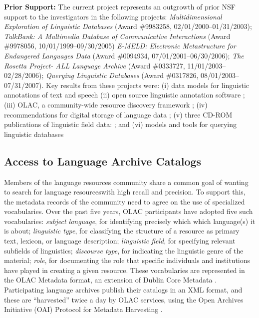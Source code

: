 \textbf{Prior Support:} The current project represents an outgrowth of
prior NSF support to the investigators in the following projects:
\textit{Multidimensional Exploration of Linguistic Databases}
  (Award \#9983258, 02/01/2000--01/31/2003);
\textit{TalkBank: A Multimedia Database of Communicative Interactions}
  (Award \#9978056, 10/01/1999--09/30/2005)
\textit{E-MELD: Electronic Metastructure for Endangered Languages Data}
  (Award \#0094934, 07/01/2001--06/30/2006);
\textit{The Rosetta Project- ALL Language Archive}
  (Award \#0333727, 11/01/2003--02/28/2006);
\textit{Querying Linguistic Databases}
  (Award \#0317826, 08/01/2003--07/31/2007).
Key results from these projects were:
(i) data models for linguistic annotations of text and speech
\citep{BirdLiberman01,MaedaBird00,GraffBird00,CottonBird02,CieriBird01,ATLAS00,BirdHarrington01}
(ii) open source linguistic annotation software
\citep{Bird01acl,MaedaBird02,BirdMaeda02,MaLee02};
(iii) OLAC, a community-wide resource discovery framework
\citep{BirdSimons00,BirdSimons00survey,BirdSimons01,BirdSimons02workshop,Simons02query,SimonsBird03lht,BirdSimons03chum,Simons03display,SimonsBird03llc,BirdSimons04metadata};
(iv) recommendations for digital storage of language data
\citep{BirdSimons03language};
(v) three CD-ROM publications of linguistic field data:
\citep{BirdBell01,Bird03paradigms,Bird03ngomba};
and
(vi) models and tools for querying linguistic databases
\citep{BirdBuneman01,BirdBunemanTan00,LaiBird04,Bird05planx,Bird06icde}




\subsection{Access to Language Archive Catalogs}


Members of the language resources community share a common goal of
wanting to search for language resourceswith high recall
and precision. To support this, the metadata records of the
community need to agree on the use of specialized vocabularies.
Over the past five years, OLAC participants have adopted five
such vocabularies:
\textit{subject language},
  for identifying precisely which which language(s) it is about;
\textit{linguistic type},
  for classifying the structure of a resource as primary text,
  lexicon, or language description;
\textit{linguistic field},
  for specifying relevant subfields of linguistics;
\textit{discourse type},
  for indicating the linguistic genre of the material;
\textit{role},
  for documenting the role that specific individuals and institutions
  have played in creating a given resource.
These vocabularies are represented in the OLAC Metadata format,
an extension of Dublin Core Metadata \citep{BirdSimons04metadata}.
Participating language archives publish their catalogs in an XML
format, and these are ``harvested'' twice a day by OLAC services,
using the Open Archives Initiative (OAI) Protocol for Metadata Harvesting
\citep{SimonsBird03lht}.

